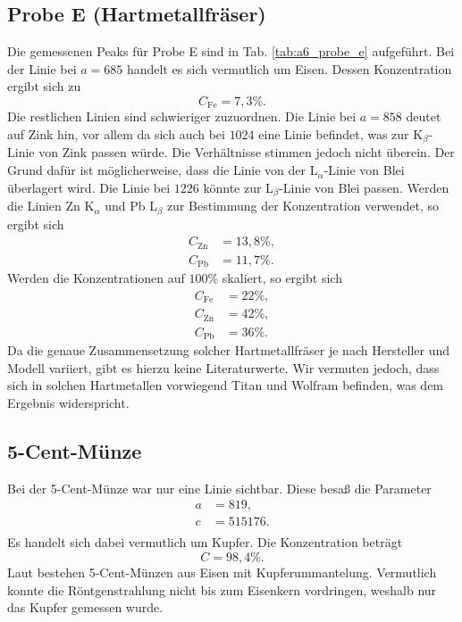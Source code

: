 \subsection{Probe E (Hartmetallfräser)}

Die gemessenen Peaks für Probe E sind in Tab. \ref{tab:a6_probe_e} aufgeführt. Bei der Linie bei $a=685$ handelt es sich vermutlich um Eisen. Dessen Konzentration ergibt sich zu
\begin{equation}
 C_{\textrm{Fe}} = 7,3\%.
\end{equation}
Die restlichen Linien sind schwieriger zuzuordnen. Die Linie bei $a=858$ deutet auf Zink hin, vor allem da sich auch bei $1024$ eine Linie befindet, was zur K$_{\beta}$-Linie von Zink passen würde. Die Verhältnisse stimmen jedoch nicht überein. 
Der Grund dafür ist möglicherweise, dass die Linie von der L$_{\alpha}$-Linie von Blei überlagert wird. Die Linie bei $1226$ könnte zur L$_{\beta}$-Linie von Blei passen. Werden die Linien Zn K$_{\alpha}$ und Pb L$_{\beta}$ zur Bestimmung der Konzentration verwendet, so ergibt sich
\begin{align}
 C_{\textrm{Zn}} &= 13,8\%, \\
 C_{\textrm{Pb}} &= 11,7\%.
\end{align}
Werden die Konzentrationen auf $100\%$ skaliert, so ergibt sich
\begin{align}
 C_{\textrm{Fe}} &= 22\%, \\
 C_{\textrm{Zn}} &= 42\%, \\
 C_{\textrm{Pb}} &= 36\%.
\end{align}
Da die genaue Zusammensetzung solcher Hartmetallfräser je nach Hersteller und Modell variiert, gibt es hierzu keine Literaturwerte. Wir vermuten jedoch, dass sich in solchen Hartmetallen vorwiegend Titan und Wolfram befinden, was dem Ergebnis widerspricht.


\subsection{5-Cent-Münze}

Bei der 5-Cent-Münze war nur eine Linie sichtbar. Diese besaß die Parameter
\begin{align}
 a &= 819, \\
 c &= 515176. \\
\end{align}
Es handelt sich dabei vermutlich um Kupfer. Die Konzentration beträgt
\begin{equation}
 C = 98,4\%.
\end{equation}
Laut \cite{wiki_5ct} bestehen 5-Cent-Münzen aus Eisen mit Kupferummantelung. Vermutlich konnte die Röntgenstrahlung nicht bis zum Eisenkern vordringen, weshalb nur das Kupfer gemessen wurde.
